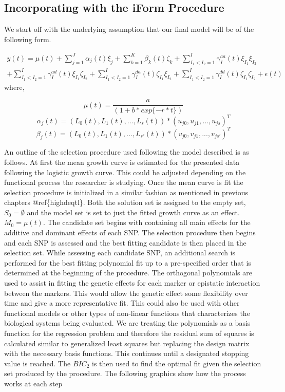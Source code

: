 \documentclass[11pt,]{book}
\theoremstyle{definition}
\theoremstyle{definition}
\theoremstyle{remark}
\begin{document}
\subsection{Incorporating with the iForm
Procedure}\label{incorporating-with-the-iform-procedure}

We start off with the underlying assumption that our final model will be
of the following form.

\[
\begin{equation}
\begin{split}
y(t) = \mu(t) + \sum_{j=1}^{J}\alpha_j(t)\xi_j + \sum_{k=1}^{K}\beta_k(t)\zeta_k + \sum_{I_1 \lt I_2=1}^{I}\gamma_I^{aa}(t) \xi_{I_1}\xi_{I_2} \\ 
+ \sum_{I_1 \lt I_2=1}^{I}\gamma_I^{ad}(t) \xi_{I_1}\zeta_{I_2} + \sum_{I_1 \lt I_2=1}^{I} \gamma_I^{da}(t) \zeta_{I_1}\xi_{I_2} + \sum_{I_1 \lt I_2=1}^{I} \gamma_I^{dd}(t)\zeta_{I_1}\zeta_{I_2} + \epsilon(t)
\end{split}
\end{equation}
\] where,

\[\mu(t)=\frac{a}{(1+b*exp\{-r*t\})}\]
\[ \alpha_j(t) = (L_0(t), L_1(t), ... , L_s(t))*(u_{j0}, u_{j1},...,u_{js})^T \]
\[ \beta_j(t) = (L_0(t), L_1(t), ... , L_{s'}(t))*(v_{j0}, v_{j1},...,v_{js'})^T \]

An outline of the selection procedure used following the model described
is as follows. At first the mean growth curve is estimated for the
presented data following the logistic growth curve. This could be
adjusted depending on the functional process the researcher is studying.
Once the mean curve is fit the selection procedure is initialized in a
similar fashion as mentioned in previous chapters @ref\{highdeqtl\}.
Both the solution set is assigned to the empty set, \(S_0=\emptyset\)
and the model set is set to just the fitted growth curve as an
effect.\(M_0=\mu(t)\). The candidate set begins with containing all main
effects for the additive and dominant effects of each SNP. The selection
procedure then begins and each SNP is assessed and the best fitting
candidate is then placed in the selection set. While assessing each
candidate SNP, an additional search is performed for the best fitting
polynomial fit up to a pre-specified order that is determined at the
beginning of the procedure. The orthogonal polynomials are used to
assist in fitting the genetic effects for each marker or epistatic
interaction between the markers. This would allow the genetic effect
some flexibility over time and give a more representative fit. This
could also be used with other functional models or other types of
non-linear functions that characterizes the biological systems being
evaluated. We are treating the polynomials as a basis function for the
regression problem and therefore the residual sum of squares is
calculated similar to generalized least squares but replacing the design
matrix with the necessary basis functions. This continues until a
designated stopping value is reached. The \(BIC_2\) is then used to find
the optimal fit given the selection set produced by the procedure. The
following graphics show how the process works at each step
\end{document}
